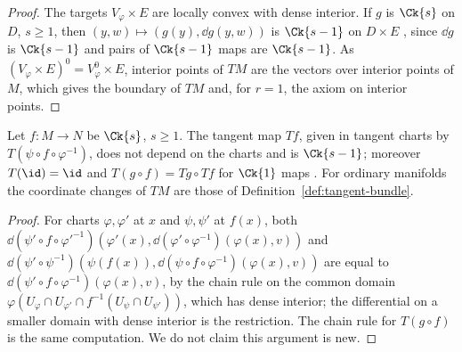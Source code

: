 \begin{proof}
  \leanok
  The targets $V_\varphi \times E$ are locally convex with dense interior. If $g$ is $\Ck{s}$ on
  $D$, $s \ge 1$, then $(y, w) \mapsto (g(y), \dd g(y, w))$ is $\Ck{s-1}$ on $D \times E$
  \cite[Definition 3.3.3, p.~256]{GN26}, since $\dd g$ is $\Ck{s-1}$ and pairs of $\Ck{s-1}$
  maps are $\Ck{s-1}$. As $(V_\varphi \times E)^0 = V_\varphi^0 \times E$, interior points of
  $TM$ are the vectors over interior points of $M$, which gives the boundary of $TM$ and, for
  $r = 1$, the axiom on interior points.
\end{proof}

\begin{theorem}
  \label{thm:rough-tangent-map}
  \leanok
  Let $f\colon M \to N$ be $\Ck{s}$, $s \ge 1$. The tangent map $Tf$, given in tangent charts by
  $T(\psi \circ f \circ \varphi^{-1})$, does not depend on the charts and is $\Ck{s-1}$; moreover
  $T(\id) = \id$ and $T(g \circ f) = Tg \circ Tf$ for $\Ck{1}$ maps
  \cite[Definition 3.3.11, p.~259; Proposition 3.3.12, p.~259; Remark 3.3.13, p.~260;
  3.5.22, p.~285]{GN26}. For ordinary manifolds the coordinate changes of $TM$ are those of
  Definition~\ref{def:tangent-bundle}.
\end{theorem}

\begin{proof}
  \leanok
  For charts $\varphi, \varphi'$ at $x$ and $\psi, \psi'$ at $f(x)$, both
  $\dd(\psi' \circ f \circ \varphi'^{-1})(\varphi'(x), \dd(\varphi' \circ \varphi^{-1})(\varphi(x), v))$
  and $\dd(\psi' \circ \psi^{-1})(\psi(f(x)), \dd(\psi \circ f \circ \varphi^{-1})(\varphi(x), v))$
  are equal to $\dd(\psi' \circ f \circ \varphi^{-1})(\varphi(x), v)$, by the chain rule on the
  common domain $\varphi(U_\varphi \cap U_{\varphi'} \cap f^{-1}(U_\psi \cap U_{\psi'}))$, which
  has dense interior; the differential on a smaller domain with dense interior is the
  restriction. The chain rule for $T(g \circ f)$ is the same computation. We do not claim this
  argument is new.
\end{proof}
